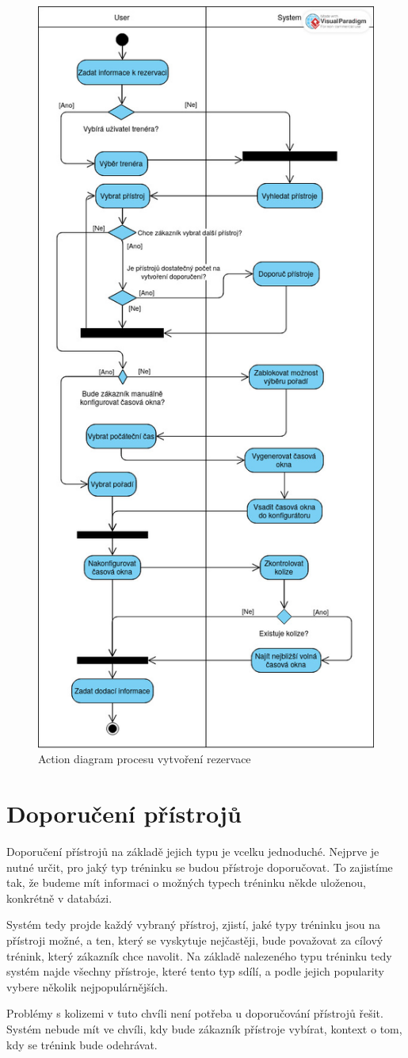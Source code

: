 \begin{figure}
    \centering
    \includegraphics[width=.5\textwidth]{Figures/Bakalarka, rezervace.jpg}
    \caption{Action diagram procesu vytvoření rezervace}
    \label{fig:ReservationActionDiagram}
\end{figure}

\section{Doporučení přístrojů}
Doporučení přístrojů na základě jejich typu je vcelku jednoduché. Nejprve je nutné určit, pro jaký typ tréninku se budou přístroje doporučovat. To zajistíme tak, že budeme mít informaci o možných typech tréninku někde uloženou, konkrétně v databázi. 

Systém tedy projde každý vybraný přístroj, zjistí, jaké typy tréninku jsou na přístroji možné, a ten, který se vyskytuje nejčastěji, bude považovat za cílový trénink, který zákazník chce navolit. Na základě nalezeného typu tréninku tedy systém najde všechny přístroje, které tento typ sdílí, a podle jejich popularity vybere několik nejpopulárnějších. 

Problémy s kolizemi v tuto chvíli není potřeba u doporučování přístrojů řešit. Systém nebude mít ve chvíli, kdy bude zákazník přístroje vybírat, kontext o tom, kdy se trénink bude odehrávat.

